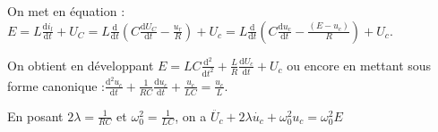 \documentclass[french]{yLectureNote}
\newcommand{\dd}{\mathrm{d}}
\begin{document}

On met en équation : \(E = L\frac{\dd i_l}{\dd t} + U_C = L\frac{\dd}{\dd t}(C\frac{\dd U_C}{\dd t} - \frac{u_r}{R})+U_c = L\frac{\dd}{\dd t}(C\frac{\dd u_c}{\dd t}-\frac{(E-u_c)}{R})+U_c\).

On obtient en développant \(E = LC\frac{\dd^2}{\dd t^2}+\frac{L}{R}\frac{\dd U_c}{\dd t} +U_c\) ou encore en mettant sous forme canonique :\(\frac{\dd^2 u_c}{\dd t} + \frac{1}{RC}\frac{\dd u_c}{\dd t}+\frac{u_c}{LC} = \frac{u_c}{L}\).

En posant \( 2\lambda = \frac{1}{RC}\) et \(\omega_0^2 = \frac{1}{LC}\), on a \(\ddot{U_c}+2\lambda \dot{u_c}+\omega_0^2 u_c = \omega_0^2 E\)

%

\end{document}
